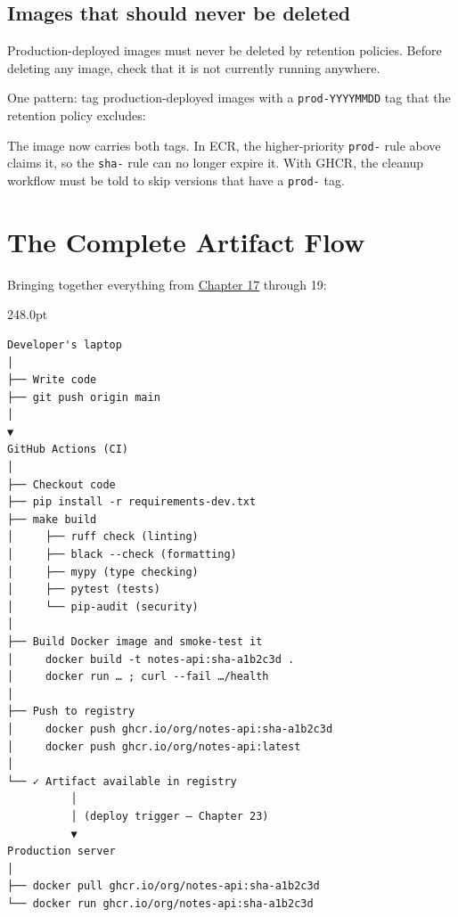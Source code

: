 \subsection*{Images that should never be deleted}\label{19-artifact-storage:images-that-should-never-be-deleted}

Production-deployed images must never be deleted by retention policies. Before deleting any image, check that it is not currently running anywhere.

One pattern: tag production-deployed images with a \texttt{prod-YYYYMMDD} tag that the retention policy excludes:

\begin{codebox}[short]

\begin{Shaded}
\begin{Highlighting}[]
\end{Highlighting}
\end{Shaded}

\end{codebox}

\noindent{}The image now carries both tags. In ECR, the higher-priority \texttt{prod-} rule above claims it, so the \texttt{sha-} rule can no longer expire it. With GHCR, the cleanup workflow must be told to skip versions that have a \texttt{prod-} tag.

\setcounter{section}{7}
\section{The Complete Artifact Flow}\label{19-artifact-storage:198-the-complete-artifact-flow}

Bringing together everything from \hyperref[ch:17-build-process]{Chapter 17} through 19:

\begin{diagrambox}[short]{248.0pt}
\begin{Verbatim}[fontsize=\fontsize{9.0}{8.55}\selectfont]
Developer's laptop
│
├── Write code
├── git push origin main
│
▼
GitHub Actions (CI)
│
├── Checkout code
├── pip install -r requirements-dev.txt
├── make build
│     ├── ruff check (linting)
│     ├── black --check (formatting)
│     ├── mypy (type checking)
│     ├── pytest (tests)
│     └── pip-audit (security)
│
├── Build Docker image and smoke-test it
│     docker build -t notes-api:sha-a1b2c3d .
│     docker run … ; curl --fail …/health
│
├── Push to registry
│     docker push ghcr.io/org/notes-api:sha-a1b2c3d
│     docker push ghcr.io/org/notes-api:latest
│
└── ✓ Artifact available in registry
          │
          │ (deploy trigger — Chapter 23)
          ▼
Production server
│
├── docker pull ghcr.io/org/notes-api:sha-a1b2c3d
└── docker run ghcr.io/org/notes-api:sha-a1b2c3d
\end{Verbatim}
\end{diagrambox}

